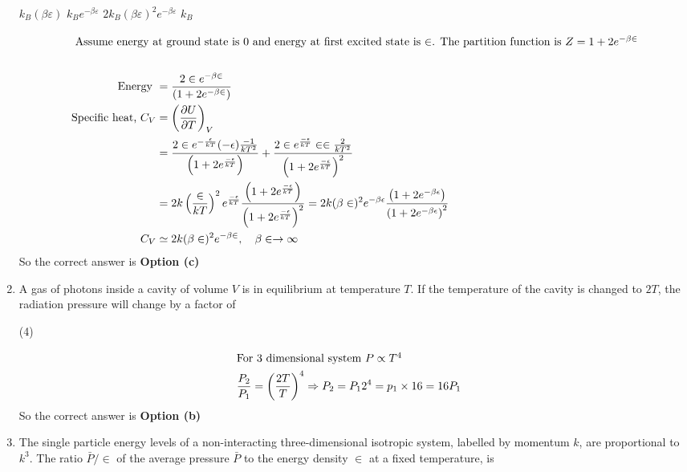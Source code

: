 \begin{enumerate}
\begin{tasks}
		\task[\textbf{a.}] $k_{B}(\beta \varepsilon)$
		\task[\textbf{b.}] $k_{B} e^{-\beta \varepsilon}$
		\task[\textbf{c.}] $2 k_{B}(\beta \varepsilon)^{2} e^{-\beta \varepsilon}$
		\task[\textbf{d.}] $k_{B}$
	\end{tasks}
\begin{answer}
	\begin{align*}
	\intertext{ Assume energy at ground state is 0 and energy at first excited state is $\in$. The partition function is $Z=1+2 e^{-\beta \in}$}\\
	\text{Energy }&=\frac{2 \in e^{-\beta \in}}{\left(1+2 e^{-\beta \in}\right)}\\
	\text{Specific heat, }C_{V}&=\left(\frac{\partial U}{\partial T}\right)_{V}\\&=\frac{2 \in e^{-\frac{\epsilon}{k T}}(-\epsilon) \frac{-1}{k T^{2}}}{\left(1+2 e^{\frac{-\epsilon}{k T}}\right)}+\frac{2 \in e^{\frac{-\epsilon}{k T}} \in \in \frac{2}{k T^{2}}}{\left(1+2 e^{\frac{-\epsilon}{k T}}\right)^{2}}\\
	&=2 k\left(\frac{\in}{k T}\right)^{2} e^{\frac{-\epsilon}{k T}} \frac{\left(1+2 e^{\frac{-\epsilon}{k T}}\right)}{\left(1+2 e^{\frac{-\epsilon}{k T}}\right)^{2}}=2 k(\beta \in)^{2} e^{-\beta \epsilon} \frac{\left(1+2 e^{-\beta \epsilon}\right)}{\left(1+2 e^{-\beta \epsilon}\right)^{2}}\\
	C_{V} &\simeq 2 k(\beta \in)^{2} e^{-\beta \in}, \quad \beta \in \rightarrow \infty
	\end{align*}
	So the correct answer is \textbf{Option (c)}
\end{answer}
	\item  A gas of photons inside a cavity of volume $V$ is in equilibrium at temperature $T$. If the temperature of the cavity is changed to $2 T$, the radiation pressure will change by a factor of
	{}
	\begin{tasks}(4)
	\end{tasks}
\begin{answer}
	\begin{align*}
	\intertext{For 3 dimensional system $P \propto T^{4}$}
	\frac{P_{2}}{P_{1}}&=\left(\frac{2 T}{T}\right)^{4} \Rightarrow P_{2}=P_{1} 2^{4}=p_{1} \times 16=16 P_{1}
	\end{align*}
	So the correct answer is \textbf{Option (b)}
\end{answer}
	\item The single particle energy levels of a non-interacting three-dimensional isotropic system, labelled by momentum $k$, are proportional to $k^{3}$. The ratio $\bar{P} / \in$ of the average pressure $\bar{P}$ to the energy density $\in$ at a fixed temperature, is

\end{enumerate}
